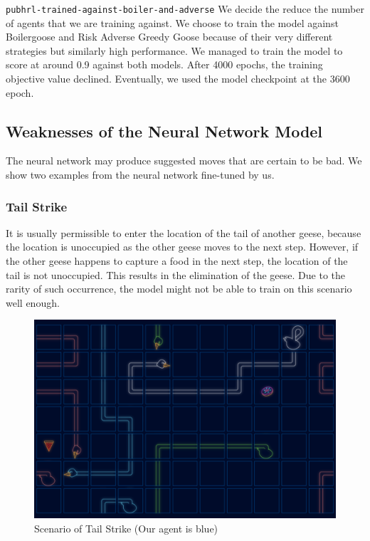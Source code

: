 \verb|pubhrl-trained-against-boiler-and-adverse|\newline
We decide the reduce the number of agents that we are training against. We choose to train the model against Boilergoose \cite{notebook_boilergoose} and Risk Adverse Greedy Goose \cite{notebook_risk_adverse_greedy} because of their very different strategies but similarly high performance. We managed to train the model to score at around 0.9 against both models. After 4000 epochs, the training objective value declined. Eventually, we used the model checkpoint at the 3600 epoch.


\subsection{Weaknesses of the Neural Network Model}
\label{subsubsection_nn_weakness}

The neural network may produce suggested moves that are certain to be bad. We show two examples from the neural network fine-tuned by us.

\subsubsection{Tail Strike}
\label{subsubsection_tail_strike}

It is usually permissible to enter the location of the tail of another geese, because the location is unoccupied as the other geese moves to the next step. However, if the other geese happens to capture a food in the next step, the location of the tail is not unoccupied. This results in the elimination of the geese. Due to the rarity of such occurrence, the model might not be able to train on this scenario well enough.

\begin{figure}[h!]
\centering
\includegraphics[width=\textwidth]{images/scenario-tail-strike.png}
\caption{Scenario of Tail Strike (Our agent is blue)}
\label{figure_tail_strike}
\end{figure}

